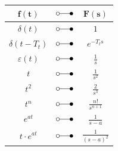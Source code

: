 \begin{minipage}[t]{0.48\columnwidth}
    \begin{center}
        \renewcommand{\arraystretch}{1.4}
        \begin{tabular}{c c c}
            \toprule
            $\bm{f(t)}$                             & $\laplace$    & $\bm{F(s)}$                   \\
            \midrule
            $\delta(t)$                             & $\laplace$    & $1$                           \\
            \midrule
            $\delta(t - T_t)$                       & $\laplace$    & $e^{-T_t s}$                  \\
            \midrule
            $\varepsilon(t)$                        & $\laplace$    & $\frac{1}{s}$                 \\
            \midrule
            $t$                                     & $\laplace$    & $\frac{1}{s^2}$               \\
            \midrule            
            $t^2$                                   & $\laplace$    & $\frac{2}{s^3}$               \\
            \midrule
            $t^n$                                   & $\laplace$    & $\frac{n!}{s^{n+1}}$          \\
            \midrule   
            $e^{at}$                                & $\laplace$    & $\frac{1}{s-a}$               \\  
            \midrule
            $t \cdot e^{at}$                        & $\laplace$    & $\frac{1}{(s-a)^2}$           \\
            \bottomrule
        \end{tabular}
        \renewcommand{\arraystretch}{1}
    \end{center}
\end{minipage}
\hfill

